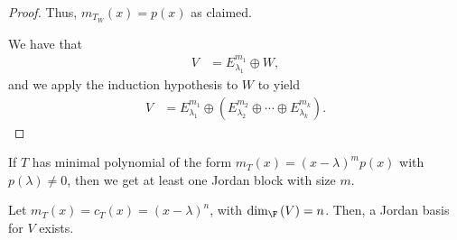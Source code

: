 \documentclass[10pt]{mypackage}
\begin{document}
\begin{proof}
  Thus, $m_{T_W}(x) = p(x)$ as claimed.\newline

  We have that
  \begin{align*}
    V &= E_{\lambda_1}^{m_1}\oplus W,
  \end{align*}
  and we apply the induction hypothesis to $W$ to yield
  \begin{align*}
    V &= E_{\lambda_1}^{m_1}\oplus \left(E_{\lambda_2}^{m_2}\oplus \cdots \oplus E_{\lambda_k}^{m_k}\right).
  \end{align*}
\end{proof}
If $T$ has minimal polynomial of the form $m_T(x) = \left(x-\lambda\right)^mp(x)$ with $p\left(\lambda\right) \neq 0$, then we get at least one Jordan block with size $m$.
\begin{lemma}
  Let $m_T(x) = c_T(x) = \left(x-\lambda\right)^n$, with $\dim_{\F}\left(V\right) = n$. Then, a Jordan basis for $V$ exists.
\end{lemma}
\end{document}
